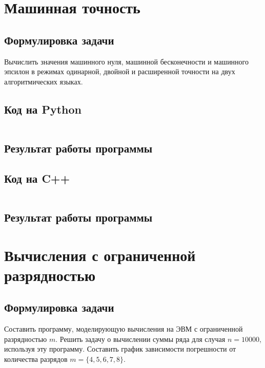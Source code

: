 \documentclass[a4paper,12pt]{article}
\newenvironment{longlisting}{\captionsetup{type=listing}}{}
\begin{document}
\section{Машинная точность}
\subsection{Формулировка задачи}
Вычислить значения машинного нуля, машинной бесконечности и машинного эпсилон в режимах одинарной, двойной и расширенной точности на двух алгоритмических языках.
\subsection{Код на Python}

\begin{longlisting}
\inputminted{python}{src/precision.py}
\end{longlisting}

\subsection{Результат работы программы}
\begin{longlisting}

\end{longlisting}

\subsection{Код на C++}
\begin{longlisting}
\inputminted{c++}{src/precision.cpp}
\end{longlisting}

\subsection{Результат работы программы}
\begin{longlisting}

\end{longlisting}


\section{Вычисления с ограниченной разрядностью}
\subsection{Формулировка задачи}
Составить программу, моделирующую вычисления на ЭВМ с ограниченной разрядностью $m$.
Решить задачу о вычислении суммы ряда для случая $n=10000$, используя эту программу. Составить график зависимости погрешности от количества разрядов $m = \{4, 5, 6, 7, 8\}$.
\end{document}
